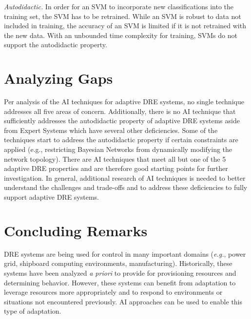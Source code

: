 \documentclass[conference]{IEEEtran}
\begin{document}
\emph{Autodidactic.} In order for an SVM to incorporate new classifications into the training set, the SVM has to be retrained. While an SVM is robust to data not included in training, the accuracy of an SVM is limited if it is not retrained with the new data. With an unbounded time complexity for training, SVMs do not support the autodidactic property.

\section{Analyzing Gaps}
\label{gap-analysis}
Per analysis of the AI techniques for adaptive DRE systems, no single technique addresses all five areas of concern. Additionally, there is no AI technique that sufficiently addresses the autodidactic property of adaptive DRE systems aside from Expert Systems which have several other deficiencies. Some of the techniques start to address the autodidactic property if certain constraints are applied (e.g., restricting Bayesian Networks from dynamically modifying the network topology).
There are AI techniques that meet all but one of the 5 adaptive DRE properties and are therefore good starting points for further investigation. In general, additional research of AI techniques is needed to better understand the challenges and trade-offs and to address these deficiencies to fully support adaptive DRE systems.


\section{Concluding Remarks}
\label{summary}
DRE systems are being used for control in many important domains (\emph{e.g.}, power grid, shipboard computing environments, manufacturing). Historically, these systems have been analyzed \emph{a priori} to provide for provisioning resources and determining behavior. However, these systems can benefit from adaptation to leverage resources more appropriately and to respond to environments or situations not encountered previously. AI approaches can be used to enable this type of adaptation.
\end{document}
